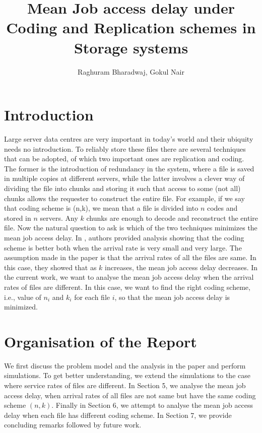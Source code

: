 \documentclass{article}
\title{Mean Job access delay under Coding and Replication schemes in Storage systems}
\author{Raghuram Bharadwaj, Gokul Nair}
\begin{document}
	\maketitle
	\section{Introduction}
	Large server data centres are very important in today's world and their ubiquity needs no introduction. To reliably store these files there are several techniques that can be adopted, of which two important ones are replication and coding. The former is the introduction of redundancy in the system, where a file is saved in multiple copies at different servers, while the latter involves a clever way of dividing the file into chunks and storing it such that access to some (not all) chunks allows the requester to construct the entire file. For example, if we say that coding scheme is (n,k), we mean that a file is divided into $n$ codes and stored in $n$ servers. Any $k$ chunks are enough to decode and reconstruct the entire file. Now the natural question to ask is which of the two techniques minimizes the mean job access delay. In \cite{imppaper}, authors provided analysis showing that the coding scheme is better both when the arrival rate is very small and very large. The assumption made in the paper is that the arrival rates of all the files are same. In this case, they showed that as $k$ increases, the mean job access delay decreases. In the current work, we want to analyse the mean job access delay when the arrival rates of files are different. In this case, we want to find the right coding scheme, i.e., value of $n_{i}$ and $k_{i}$ for each file $i$, so that the mean job access delay is minimized. 
	
\section{Organisation of the Report}
We first discuss the problem model and the analysis in the paper \cite{imppaper} and perform simulations. To get better understanding, we extend the simulations to the case where service rates of files are different. In Section 5, we analyse the mean job access delay, when arrival rates of all files are not same but have the same coding scheme $(n,k)$. Finally in Section 6, we attempt to analyse the mean job access delay when each file has different coding scheme. In Section 7, we provide concluding remarks followed by future work. 
\end{document}
